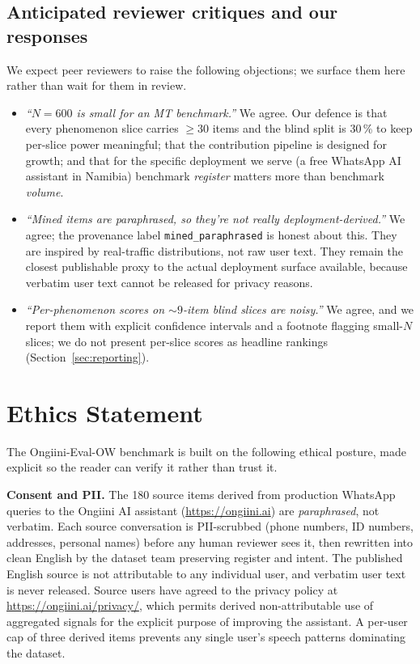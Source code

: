 \documentclass[11pt]{article}
\begin{document}
\subsection*{Anticipated reviewer critiques and our responses}

We expect peer reviewers to raise the following objections; we
surface them here rather than wait for them in review.

\begin{itemize}
\item \emph{``$N = 600$ is small for an MT benchmark.''} We agree.
  Our defence is that every phenomenon slice carries $\geq 30$
  items and the blind split is 30\,\% to keep per-slice power
  meaningful; that the contribution pipeline is designed for
  growth; and that for the specific deployment we serve (a free
  WhatsApp AI assistant in Namibia) benchmark \emph{register}
  matters more than benchmark \emph{volume}.
\item \emph{``Mined items are paraphrased, so they're not really
  deployment-derived.''} We agree; the provenance label
  \texttt{mined\_paraphrased} is honest about this. They are
  inspired by real-traffic distributions, not raw user text. They
  remain the closest publishable proxy to the actual deployment
  surface available, because verbatim user text cannot be
  released for privacy reasons.
\item \emph{``Per-phenomenon scores on $\sim 9$-item blind slices
  are noisy.''} We agree, and we report them with explicit
  confidence intervals and a footnote flagging small-$N$ slices;
  we do not present per-slice scores as headline rankings
  (Section~\ref{sec:reporting}).
\end{itemize}

\section*{Ethics Statement}
\label{sec:ethics}

The Ongiini-Eval-OW benchmark is built on the following ethical
posture, made explicit so the reader can verify it rather than
trust it.

\textbf{Consent and PII.} The 180 source items derived from
production WhatsApp queries to the Ongiini AI assistant
(\url{https://ongiini.ai}) are \emph{paraphrased}, not verbatim.
Each source conversation is PII-scrubbed (phone numbers, ID
numbers, addresses, personal names) before any human reviewer sees
it, then rewritten into clean English by the dataset team
preserving register and intent. The published English source is
not attributable to any individual user, and verbatim user text is
never released. Source users have agreed to the privacy policy at
\url{https://ongiini.ai/privacy/}, which permits derived
non-attributable use of aggregated signals for the explicit purpose
of improving the assistant. A per-user cap of three derived items
prevents any single user's speech patterns dominating the dataset.
\end{document}
